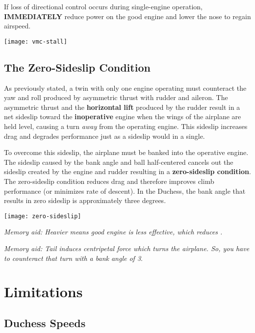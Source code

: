 If loss of directional control occurs during single-engine operation, \textbf{IMMEDIATELY} reduce power on the good
engine and lower the nose to regain airspeed.

\begin{center}
\texttt{[image: vmc-stall]}
\end{center}

\section{The Zero-Sideslip Condition}

As previously stated, a twin with only one engine operating must counteract the yaw and roll produced by
asymmetric thrust with rudder and aileron. The asymmetric thrust and the \textbf{horizontal lift} produced by the rudder
result in a net sideslip toward the \textbf{inoperative} engine when the wings of the airplane are held level,
causing a turn \emph{away} from the operating engine. This sideslip increases drag and degrades performance
just as a sideslip would in a single.

To overcome this sideslip, the airplane must be banked into the operative engine. The sideslip caused by the bank
angle and ball half-centered cancels out the sideslip created by the engine and rudder resulting in a
\textbf{zero-sideslip condition}. The zero-sideslip condition reduces
drag and therefore improves climb performance (or minimizes rate
of descent). In the Duchess, the bank angle that results in zero sideslip is approximately three degrees.

\begin{center}
\texttt{[image: zero-sideslip]}
\end{center}

\emph{Memory aid: Heavier means good engine is less effective, which reduces \vmc.}

\emph{Memory aid: Tail induces centripetal force which turns the airplane. So, you have to counteract that turn
with a bank angle of \emph{3\degree}}.

\chapter{Limitations}

\section{Duchess Speeds}


